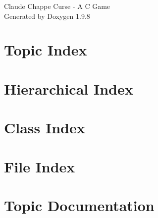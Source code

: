 \documentclass[twoside]{book}
\newcommand{\+}{\discretionary{\mbox{\scriptsize$\hookleftarrow$}}{}{}}
\newcommand{\clearemptydoublepage}{%
    \newpage{\pagestyle{empty}\cleardoublepage}%
  }
\begin{document}
  \raggedbottom
    \hypersetup{pageanchor=false,
                bookmarksnumbered=true,
                pdfencoding=unicode
               }
  \begin{titlepage}
  \vspace*{7cm}
  \begin{center}%
  {\Large Claude Chappe\textquotesingle{} Curse -\/ A C Game}\\
  \vspace*{1cm}
  {\large Generated by Doxygen 1.9.8}\\
  \end{center}
  \end{titlepage}
  \clearemptydoublepage
  \tableofcontents
  \clearemptydoublepage
  \hypersetup{pageanchor=true}

\chapter{Topic Index}

\chapter{Hierarchical Index}

\chapter{Class Index}

\chapter{File Index}

\chapter{Topic Documentation}





























\end{document}
